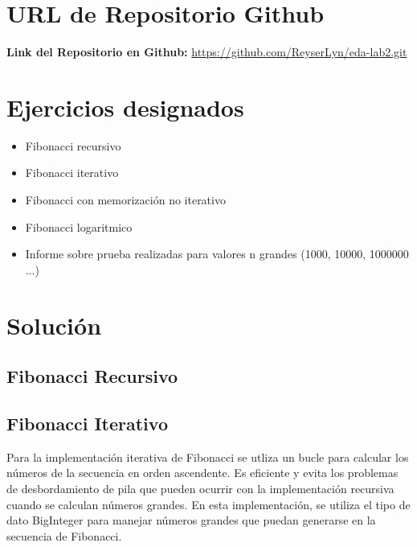 \documentclass{article}
\begin{document}
    \section{URL de Repositorio Github}
        \textbf{Link del Repositorio en Github: }    
            \url{https://github.com/ReyserLyn/eda-lab2.git}

	
    \section{Ejercicios designados}

    \begin{itemize}
        \item Fibonacci recursivo
        \item Fibonacci iterativo
        \item Fibonacci con memorización no iterativo
        \item Fibonacci logaritmico
        \item Informe sobre prueba realizadas para valores n grandes (1000, 10000, 1000000 ...)
    \end{itemize}

    \section{Solución}
        \subsection{Fibonacci Recursivo}

        
        \subsection{Fibonacci Iterativo}
            Para la implementación iterativa de Fibonacci se utliza un bucle para calcular los números de la secuencia en orden ascendente. Es eficiente y evita los problemas de desbordamiento de pila que pueden ocurrir con la implementación recursiva cuando se calculan números grandes. En esta implementación, se utiliza el tipo de dato BigInteger para manejar números grandes que puedan generarse en la secuencia de Fibonacci.
            
            	
            
\end{document}
